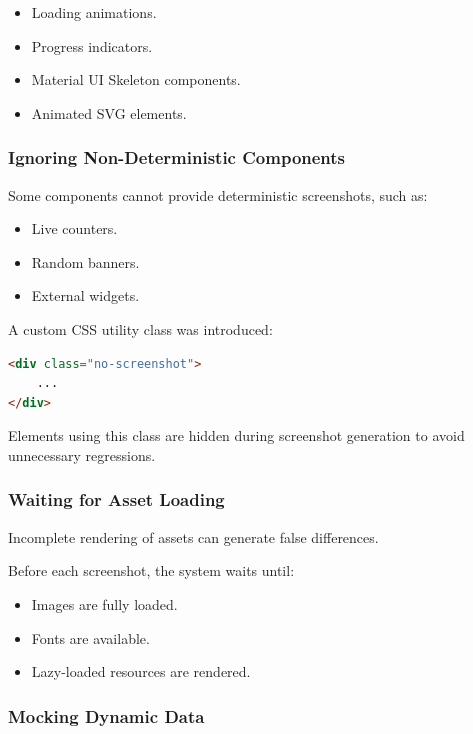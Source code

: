 \begin{itemize}
    \item Loading animations.
    \item Progress indicators.
    \item Material UI Skeleton components.
    \item Animated SVG elements.
\end{itemize}


\subsubsection{Ignoring Non-Deterministic Components}

Some components cannot provide deterministic screenshots, such as:

\begin{itemize}
    \item Live counters.
    \item Random banners.
    \item External widgets.
\end{itemize}

A custom CSS utility class was introduced:

\begin{lstlisting}[language=HTML]
<div class="no-screenshot">
    ...
</div>
\end{lstlisting}

Elements using this class are hidden during screenshot generation to avoid unnecessary regressions.


\subsubsection{Waiting for Asset Loading}

Incomplete rendering of assets can generate false differences.

Before each screenshot, the system waits until:

\begin{itemize}
    \item Images are fully loaded.
    \item Fonts are available.
    \item Lazy-loaded resources are rendered.
\end{itemize}


\subsubsection{Mocking Dynamic Data}

